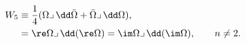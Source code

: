\begin{equation}
\label{leep}
\begin{aligned}
   W_5 &\equiv \frac{1}{4}(\Omega\lrcorner\,\dd\bar\Omega 
           + \bar\Omega\lrcorner\,\dd\Omega ) , \\
       &= \re\Omega \lrcorner\,\dd(\re\Omega)
      = \im\Omega \lrcorner\,\dd(\im\Omega), \qquad n\ne 2.
\end{aligned}
\end{equation}

